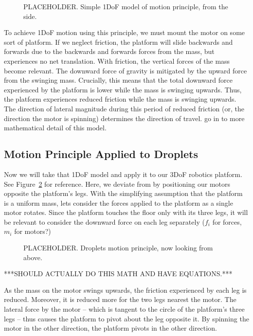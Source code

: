 \documentclass[letterpaper, 10pt, conference]{ieeeconf}
\begin{document}
\begin{figure}
\centering
\caption{PLACEHOLDER. Simple 1DoF model of motion principle, from the side.}
\label{motorDiagram}
\end{figure}

To achieve 1DoF motion using this principle, we must mount the motor on some sort of platform. If we neglect friction, the platform will slide backwards and forwards due to the backwards and forwards forces from the mass, but experiences no net translation. With friction, the vertical forces of the mass become relevant. The downward force of gravity is mitigated by the upward force from the swinging mass. Crucially, this means that the total downward force experienced by the platform is lower while the mass is swinging upwards. Thus, the platform experiences reduced friction while the mass is swinging upwards. The direction of lateral magnitude during this period of reduced friction (or, the direction the motor is spinning) determines the direction of travel. \cite{Vartholomeos2005,Vartholomeos2006} go in to more mathematical detail of this model.

\subsection{Motion Principle Applied to Droplets}

Now we will take that 1DoF model and apply it to our 3DoF robotics platform. See Figure~\ref{dropletMotorDiagram} for reference. Here, we deviate from \cite{Vartholomeos2005} by positioning our motors opposite the platform's legs. With the simplifying assumption that the platform is a uniform mass, lets consider the forces applied to the platform as a single motor rotates. Since the platform touches the floor only with its three legs, it will be relevant to consider the downward force on each leg separately ($f_i$ for forces, $m_i$ for motors?)

\begin{figure}
\centering
\caption{PLACEHOLDER. Droplets motion principle, now looking from above.}
\label{dropletMotorDiagram}
\end{figure}

***SHOULD ACTUALLY DO THIS MATH AND HAVE EQUATIONS.***

As the mass on the motor swings upwards, the friction experienced by each leg is reduced. Moreover, it is reduced more for the two legs nearest the motor. The lateral force by the motor -- which is tangent to the circle of the platform's three legs -- thus causes the platform to pivot about the leg opposite it. By spinning the motor in the other direction, the platform pivots in the other direction.
\end{document}
